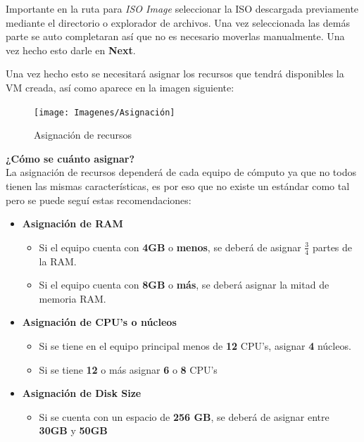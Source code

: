 \documentclass[letter,11pt]{article} %
\begin{document}
\begin{enumerate}
		Importante en la ruta para \textit{ISO Image} seleccionar la ISO descargada previamente mediante el directorio o explorador de archivos. Una vez seleccionada las demás parte se auto completaran así que no es necesario moverlas manualmente. Una vez hecho esto darle en \textbf{Next}.
		
		Una vez hecho esto se necesitará asignar los recursos que tendrá disponibles la VM creada, así como aparece en la imagen siguiente:
		
		\begin{figure}[H]
			\centering
			\texttt{[image: Imagenes/Asignación]}
			\caption{Asignación de recursos}
			\label{fig:asignacion}
		\end{figure}
		
		\textbf{¿Cómo se cuánto asignar?} \\
		La asignación de recursos dependerá de cada equipo de cómputo ya que no todos tienen las mismas características, es por eso que no existe un estándar como tal pero se puede seguí estas recomendaciones:
		
		\begin{itemize}
			\item \textbf{Asignación de RAM}
			\begin{itemize}
				\item Si el equipo cuenta con \textbf{4GB} o \textbf{menos}, se deberá de asignar  $\frac{3}{4}$ partes de la RAM.
				
				\item Si el equipo cuenta con \textbf{8GB} o \textbf{más}, se deberá asignar la mitad de memoria RAM.
			\end{itemize}
			
			
			\item \textbf{Asignación de CPU's o núcleos}
			\begin{itemize}
				\item Si se tiene en el equipo principal menos de \textbf{12} CPU's, asignar \textbf{4} núcleos.
				
				\item Si se tiene \textbf{12} o más asignar \textbf{6} o \textbf{8} CPU's
			\end{itemize}
			
			\item \textbf{Asignación de Disk Size}
			\begin{itemize}
				\item Si se cuenta con un espacio de \textbf{256 GB}, se deberá de asignar entre \textbf{30GB} y \textbf{50GB}
				

\end{itemize}
\end{itemize}
\end{enumerate}
\end{document}
